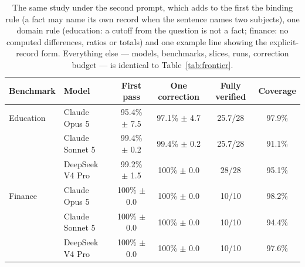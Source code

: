 \documentclass[11pt,a4paper]{article}
\begin{document}
\begin{table}[h]
\centering
\small
\begin{tabular}{llcccc}
\toprule
\textbf{Benchmark} & \textbf{Model} & \textbf{First pass} & \textbf{One correction} & \textbf{Fully verified} & \textbf{Coverage} \\
\midrule
Education & Claude Opus 5 & 95.4\% $\pm$ 7.5 & 97.1\% $\pm$ 4.7 & 25.7/28 & 97.9\% \\
 & Claude Sonnet 5 & 99.4\% $\pm$ 0.2 & 99.4\% $\pm$ 0.2 & 25.7/28 & 91.1\% \\
 & DeepSeek V4 Pro & 99.2\% $\pm$ 1.5 & 100\% $\pm$ 0.0 & 28/28 & 95.1\% \\
\midrule
Finance & Claude Opus 5 & 100\% $\pm$ 0.0 & 100\% $\pm$ 0.0 & 10/10 & 98.2\% \\
 & Claude Sonnet 5 & 100\% $\pm$ 0.0 & 100\% $\pm$ 0.0 & 10/10 & 94.4\% \\
 & DeepSeek V4 Pro & 100\% $\pm$ 0.0 & 100\% $\pm$ 0.0 & 10/10 & 97.6\% \\
\bottomrule
\end{tabular}
\caption{The same study under the second prompt, which adds to the first the binding rule (a fact may name its own record when the sentence names two subjects), one domain rule (education: a cutoff from the question is not a fact; finance: no computed differences, ratios or totals) and one example line showing the explicit-record form. Everything else --- models, benchmarks, slices, runs, correction budget --- is identical to Table~\ref{tab:frontier}.}
\label{tab:frontier2}
\end{table}
\end{document}
